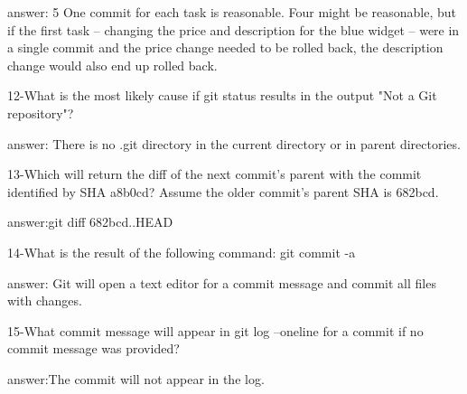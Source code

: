 answer: 5
    One commit for each task is reasonable. 
    Four might be reasonable, but if the first task -- changing the price and description for the blue widget -- were in a single commit and the price change needed to be rolled back, the description change would also end up rolled back.

12-What is the most likely cause if git status results in the output "Not a Git repository"?

answer: There is no .git directory in the current directory or in parent directories.

13-Which will return the diff of the next commit's parent with the commit identified by SHA a8b0cd? Assume the older commit's parent SHA is 682bcd.

answer:git diff 682bcd..HEAD

14-What is the result of the following command: git commit -a

answer: Git will open a text editor for a commit message and commit all files with changes.

15-What commit message will appear in git log --oneline for a commit if no commit message was provided?

answer:The commit will not appear in the log.
